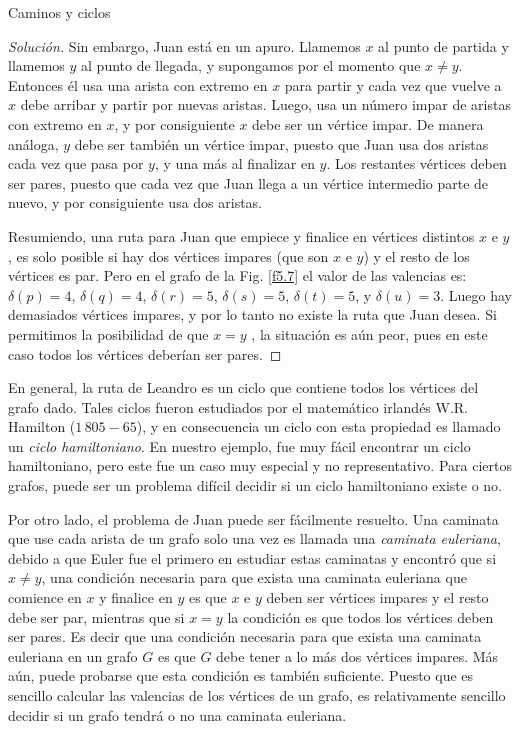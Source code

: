 \begin{section}{Caminos y ciclos}
\begin{ejemplo}
\begin{proof}[Solución]
    Sin embargo, Juan está en un apuro. Llamemos $x$ al punto de partida y llamemos $y$ al punto de llegada, y supongamos por el momento que $x \not= y$. Entonces él usa una arista con extremo en $x$ para partir y cada vez que vuelve a $x$ debe arribar y partir por nuevas aristas. Luego, usa un número impar de aristas con extremo en $x$, y por consiguiente $x$ debe ser un vértice impar. De manera análoga, $y$ debe ser también un vértice impar, puesto que Juan usa dos aristas cada vez que pasa por $y$, y una más al finalizar en $y$. Los restantes vértices deben ser pares, puesto que cada vez que Juan llega a un vértice intermedio parte de nuevo, y por consiguiente usa dos aristas.
    
    Resumiendo, una ruta para Juan que empiece y finalice en vértices distintos $x$ e $y$, es solo posible si hay dos vértices impares (que son $x$ e $y$) y el resto de los vértices es par.  Pero en el grafo de la Fig. \ref{f5.7} el valor de las valencias es: $\delta(p)=4$, $\delta(q)=4$, $\delta(r)=5$, $\delta(s)=5$, $\delta(t)=5$, y $\delta(u)=3$. Luego hay demasiados vértices impares, y por lo tanto no existe la ruta que Juan desea. Si permitimos la posibilidad de que $x=y$ , la situación es aún peor, pues en este caso todos los vértices deberían ser pares.
\end{proof}
\end{ejemplo}

En general, la ruta de Leandro es un ciclo que contiene todos los vértices del grafo dado. Tales ciclos fueron estudiados por el matemático irlandés W.R. Hamilton ($1\,805-65$),   y en consecuencia un ciclo con esta propiedad es llamado un \textit{ciclo hamiltoniano}. En nuestro ejemplo, fue muy fácil  encontrar un ciclo hamiltoniano, pero este fue un caso muy especial y no representativo. Para ciertos grafos, puede ser un problema difícil decidir si un ciclo hamiltoniano existe o no.

Por otro lado, el problema de Juan puede ser fácilmente resuelto. Una caminata que use cada arista de un grafo solo una vez es llamada una \textit{caminata euleriana}, debido a que Euler  fue el primero en estudiar estas caminatas y encontró que si $x\not= y$, una condición necesaria para que exista una caminata euleriana que comience en $x$ y finalice en $y$ es que $x$ e $y$ deben ser vértices impares y el resto debe ser par, mientras que si $x=y$ la condición es que todos los vértices deben ser pares. Es decir que una condición necesaria para que exista una caminata euleriana en un grafo $G$
es que $G$ debe tener a lo más dos vértices impares. Más aún, puede probarse que esta condición es también suficiente. Puesto que es sencillo calcular las valencias de los vértices de un grafo, es relativamente sencillo decidir si un grafo tendrá o no una caminata euleriana. 


\end{section}
